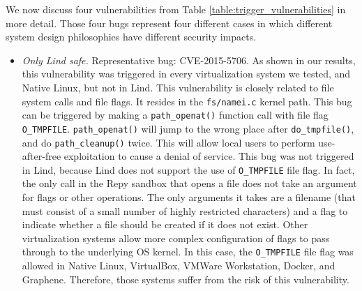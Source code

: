 We now discuss four vulnerabilities from Table \ref{table:trigger_vulnerabilities} 
in more detail. Those four bugs represent four different cases in which 
different system design philosophies have different security impacts. 

\begin{itemize}
\item \emph{Only Lind safe.}  Representative bug: CVE-2015-5706. As 
shown in our results, this vulnerability was triggered in every 
virtualization system we tested, and Native Linux, but not in Lind. This vulnerability 
is closely related to file system calls and file flags. It resides in the \texttt{fs/namei.c} 
kernel path. This bug can be triggered by making a \texttt{path\_openat()} function 
call with file flag \texttt{O\_TMPFILE}. \texttt{path\_openat()} will jump to the wrong 
place after \texttt{do\_tmpfile()}, and do \texttt{path\_cleanup()} twice. This will 
allow local users to perform use-after-free exploitation to cause a denial of service. 
This bug was not triggered in Lind, because Lind does not support the use of 
\texttt{O\_TMPFILE} file flag. In fact, the only call in the Repy sandbox that
opens a file does not take an argument for flags or other operations.  The
only arguments it takes are a filename (that must consist of a small number
of highly restricted characters) and a flag to indicate whether a file should
be created if it does not exist.
Other virtualization systems allow more complex configuration of flags to 
pass through to the underlying OS kernel.   
In this case, the \texttt{O\_TMPFILE} file flag was 
allowed in Native Linux, VirtualBox, VMWare Workstation, Docker, and Graphene. Therefore, 
those systems suffer from the risk of this vulnerability.


\end{itemize}
